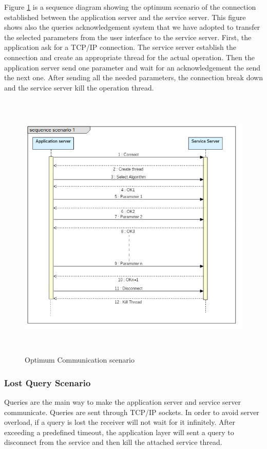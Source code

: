 Figure \ref{seq1} is a sequence diagram showing the optimum scenario of the connection established between the application server and the service server. This figure shows also the queries acknowledgement system that we have adopted to transfer the selected parameters from the user interface to the service server. First, the application ask for a TCP/IP connection. The service server establish the connection and create an appropriate thread for the actual operation. Then the application server send one parameter and wait for an acknowledgement  the send the next one. After sending all the needed parameters, the connection break down and the service server kill the operation thread. 

\begin{figure}[!ht]
\begin{center}
\includegraphics[width=12cm,height=13cm]{chapter4/SequenceDiagram1.png}
\end{center}
\caption{Optimum Communication scenario}
\label{seq1}
\end{figure}



\subsubsection{Lost Query Scenario}
Queries are the main way to make the application server and service server communicate. Queries are sent through TCP/IP sockets. In order to avoid server overload, if a query is lost the receiver will not wait for it infinitely. After exceeding a predefined timeout, the application layer will sent a query to disconnect from the service and then kill the attached service thread.\\

